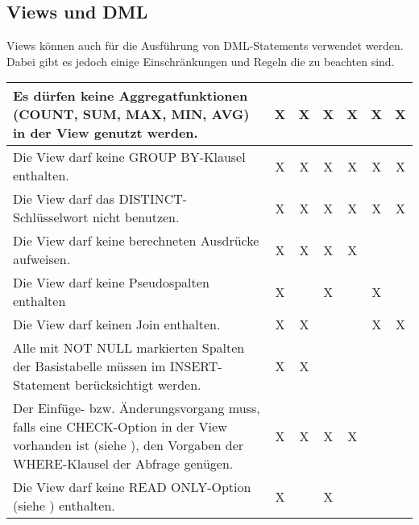 \subsection{Views und DML}
Views können  auch für die Ausführung von DML-Statements verwendet werden. Dabei gibt es jedoch einige Einschränkungen und Regeln die zu beachten sind.
\begin{center}
    \label{rulesdmlviews}
    \begin{small}
        \tabletail{
            \hline
        }
        \tablelasttail {
            \hline
        }
        \begin{supertabular}{|p{9cm}|c|c|c|c|c|c|}
            Es dürfen keine Aggregatfunktionen (COUNT, SUM, MAX, MIN, AVG) in der View genutzt werden. & X & X & X & X & X & X \\
            \hline
            Die View darf keine GROUP BY-Klausel enthalten. & X & X & X & X & X & X \\
            \hline
            Die View darf das DISTINCT-Schlüsselwort nicht benutzen. & X & X & X & X & X & X\\
            \hline
            Die View darf keine berechneten Ausdrücke aufweisen. & X & X & X & X & & \\
            \hline
            Die View darf keine Pseudospalten enthalten & X & & X & & X & \\
            \hline
            Die View darf keinen Join enthalten. & X & X & & & X & X \\
            \hline
            Alle mit NOT NULL markierten Spalten der Basistabelle müssen im INSERT-Statement berücksichtigt werden. & X & X & & & & \\
            \hline
            Der Einfüge- bzw. Änderungsvorgang muss, falls eine CHECK-Option in der View vorhanden ist (siehe ), den Vorgaben der WHERE-Klausel der Abfrage genügen. & X & X & X & X & & \\
            \hline
            Die View darf keine READ ONLY-Option (siehe ) enthalten. & X & & X & & &\\
        \end{supertabular}
    \end{small}
\end{center}
